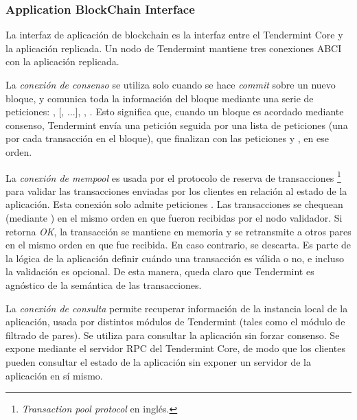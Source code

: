 \subsubsection{Application BlockChain Interface}\label{subsec:abci}
La interfaz de aplicación de blockchain es la interfaz entre el Tendermint Core y la aplicación replicada.
%
Un nodo de Tendermint mantiene tres conexiones ABCI con la aplicación replicada.
%

La \textit{conexión de consenso} se utiliza solo cuando se hace \textit{commit} sobre un nuevo bloque,
y comunica toda la información del bloque mediante una serie de peticiones: 
\BeginBlock, [\DeliverTx, ...], \EndBlock, \Commit.
%
Esto significa que, cuando un bloque es acordado mediante consenso, Tendermint envía una petición \BeginBlock
seguida por una lista de peticiones \DeliverTx (una por cada transacción en el bloque), que finalizan con las
peticiones \EndBlock y \Commit, en ese orden.

%

La \textit{conexión de mempool} es usada por el protocolo de reserva de transacciones \footnote{\textit{Transaction pool protocol}
en inglés.} para validar las transacciones enviadas por los clientes en relación al estado de la aplicación.
%
Esta conexión solo admite peticiones \CheckTx. Las transacciones se chequean (mediante \CheckTx) en el mismo orden
en que fueron recibidas por el nodo validador.
%
Si \CheckTx retorna \textit{OK}, la transacción se mantiene en memoria y se retransmite a otros pares en el mismo orden
en que fue recibida.
%
En caso contrario, se descarta.
%
Es parte de la lógica de la aplicación definir cuándo una transacción es válida o no, e incluso la validación es opcional.
%
De esta manera, queda claro que Tendermint es agnóstico de la semántica de las transacciones.

%

La \textit{conexión de consulta} permite recuperar información de la instancia local de la aplicación, usada
por distintos módulos de Tendermint (tales como el módulo de filtrado de pares).
%
Se utiliza para consultar la aplicación sin forzar consenso.
%
Se expone mediante el servidor RPC del Tendermint Core, de modo que los clientes pueden
consultar el estado de la aplicación sin exponer un servidor de la aplicación en sí mismo. 

